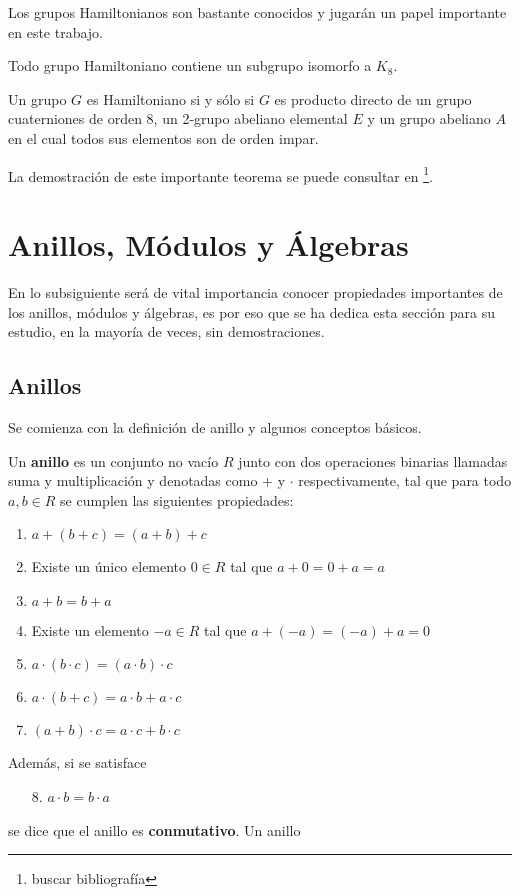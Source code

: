 Los grupos Hamiltonianos son bastante conocidos y jugarán un papel importante en este trabajo.
\begin{lema}
Todo grupo Hamiltoniano contiene un subgrupo isomorfo a $K_8$.
\end{lema}
\begin{teorema}
Un grupo $G$ es Hamiltoniano si y sólo si $G$ es producto directo de un grupo cuaterniones de orden 8, un 2-grupo abeliano elemental $E$ y un grupo abeliano $A$ en el cual todos sus elementos son de orden impar.
\end{teorema}
La demostración de este importante teorema se puede consultar en \footnote{buscar bibliografía}.





\section{Anillos, Módulos y Álgebras}
En lo subsiguiente será de vital importancia conocer propiedades importantes de los anillos, módulos y álgebras, es por eso que se ha dedica esta sección para su estudio, en la mayoría de veces, sin demostraciones.
\subsection{Anillos}
Se comienza con la definición de anillo y algunos conceptos básicos.
\begin{definicion}
Un \textbf{anillo} es un conjunto no vacío $R$ junto con dos operaciones binarias llamadas suma y multiplicación y denotadas como $+$ y $\cdot$ respectivamente, tal que para todo $a,b\in R$ se cumplen las siguientes propiedades:
\begin{enumerate}
\item $a+(b+c) = (a+b)+c$
\item Existe un único elemento $0\in R$ tal que $a+0=0+a=a$
\item $a+b=b+a$
\item Existe un elemento $-a\in R$ tal que $a+(-a) = (-a)+a=0$
\item $a\cdot(b\cdot c) = (a\cdot b)\cdot c$
\item $a\cdot(b+c) = a\cdot b+ a\cdot c$
\item $(a+b)\cdot c= a\cdot c+b\cdot c $
\end{enumerate}
Además, si se satisface
\begin{enumerate}
\item[8.] $a \cdot b = b\cdot a$
\end{enumerate}
se dice que el anillo es \textbf{conmutativo}.
Un anillo 
\end{definicion}



